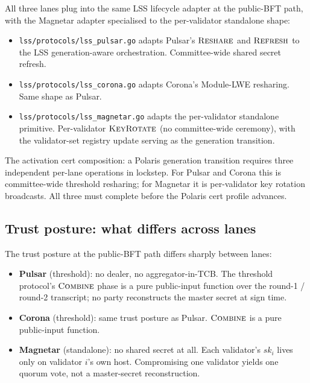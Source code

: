 All three lanes plug into the same LSS \cite{luxlssmpc} lifecycle
adapter at the public-BFT path, with the Magnetar adapter
specialised to the per-validator standalone shape:
\begin{itemize}[leftmargin=2em,nosep]
  \item \texttt{lss/protocols/lss\_pulsar.go} adapts Pulsar's
        $\textsc{Reshare}$ and $\textsc{Refresh}$ to the LSS
        generation-aware orchestration. Committee-wide shared
        secret refresh.
  \item \texttt{lss/protocols/lss\_corona.go} adapts Corona's
        Module-LWE resharing. Same shape as Pulsar.
  \item \texttt{lss/protocols/lss\_magnetar.go} adapts the
        per-validator standalone primitive. Per-validator
        $\textsc{KeyRotate}$ (no committee-wide ceremony), with
        the validator-set registry update serving as the
        generation transition.
\end{itemize}

The activation cert composition: a Polaris generation transition
requires three independent per-lane operations in lockstep.
For Pulsar and Corona this is committee-wide threshold resharing;
for Magnetar it is per-validator key rotation broadcasts. All
three must complete before the Polaris cert profile advances.

\subsection{Trust posture: what differs across lanes}
\label{sec:cmp:caveat-differ}

The trust posture at the public-BFT path differs sharply between
lanes:
\begin{itemize}[leftmargin=2em,nosep]
  \item \textbf{Pulsar} (threshold): no dealer, no aggregator-in-TCB.
        The threshold protocol's $\textsc{Combine}$ phase is a pure
        public-input function over the round-1 / round-2 transcript;
        no party reconstructs the master secret at sign time.
  \item \textbf{Corona} (threshold): same trust posture as Pulsar.
        $\textsc{Combine}$ is a pure public-input function.
  \item \textbf{Magnetar} (standalone): no shared secret at all.
        Each validator's $sk_i$ lives only on validator $i$'s own
        host. Compromising one validator yields one quorum vote,
        not a master-secret reconstruction.
\end{itemize}

